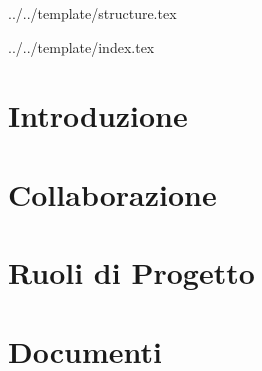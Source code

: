 


\def\DOCUMENTO{Norme di Progetto}
\def\VERSIONE{1.0.0}

\def\DESCRIZIONE{Documento contenente l'insieme di norme stabilite dal gruppo \GRUPPO per la realizzazione del progetto didattico \PROGETTO.}

\def\REDATTORE {Suierica Bogdan \\ & Crespan Emanuele}
\def\VERIFICATORE {Agostinetto Matteo}
\def\RESPONSABILE {Burlin Valerio}

\def\USO {Interno}

\def\DISTRIBUZIONE {\GRUPPO{}\\ & \COMMITTENTE{}\\}

\def\DESCRIZIONE {Documento contenente l'insieme di norme stabilite dal gruppo \GRUPPO\ per la realizzazione di \PROGETTO.}


\def\INDICE	{true}
\def\TABELLE {false}
\def\FIGURE {true}


 {../../template/structure.tex}



 {../../template/index.tex}


\section{Introduzione}

\newpage
\section{Collaborazione}

\newpage
\section{Ruoli di Progetto}

\newpage
\section{Documenti}

\newpage
